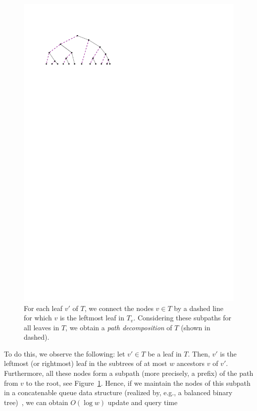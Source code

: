 \documentclass[a4paper,11pt]{article}
\newcommand{\?}{\mskip1.5mu}
\begin{document}
\begin{figure}
\centering
\includegraphics{pathdecomp}
\caption{For each leaf $v'$ of $T$, we connect the nodes
$v \in T$ by a dashed line for which $v$ is the leftmost leaf in $T_v$.
Considering these
subpaths for all leaves in $T$, we obtain a \emph{path decomposition}
of $T$ (shown in dashed).}
\label{fig:pathdecomp}
\end{figure}
To do this, we observe the following: let $v' \in T$ be 
a leaf in $T$. Then, $v'$ is the leftmost (or rightmost)
leaf in the subtrees of at most $w$ ancestors $v$ of $v'$.
Furthermore, all these nodes form a subpath (more precisely,
a prefix) of the path from $v$ to the root, see Figure~\ref{fig:pathdecomp}.
Hence, if we maintain the nodes of 
this subpath in a concatenable queue data structure
(realized by, e.g., a balanced binary tree)~\cite{PreparateSh85},
we can obtain $O(\log w)$ update and query time
\end{document}
